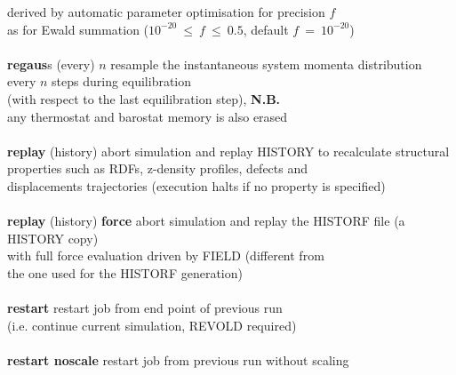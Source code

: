 \begin{tabbing}
\>                                              \> derived by automatic parameter optimisation for precision $f$ \\
\>                                              \> as for Ewald summation ($10^{-20}~\le~f~\le~0.5$, default $f~=~10^{-20}$) \\
\>                                              \> \\
\> {\bf regaus}s (every) $n$                    \> resample the instantaneous system momenta distribution \\
\>                                              \> every $n$ steps during equilibration \\
\>                                              \> (with respect to the last equilibration step), {\bf N.B.} \\
\>                                              \> any thermostat and barostat memory is also erased \\
\>                                              \> \\
\> {\bf replay} (history)                       \> abort simulation and replay HISTORY to recalculate structural \\
\>                                              \> properties such as RDFs, z-density profiles, defects and \\
\>                                              \> displacements trajectories (execution halts if no property is specified) \\
\>                                              \> \\
\> {\bf replay} (history) {\bf force}           \> abort simulation and replay the HISTORF file (a HISTORY copy) \\
\>                                              \> with full force evaluation driven by FIELD (different from \\
\>                                              \> the one used for the HISTORF generation) \\
\>                                              \> \\
\> {\bf restart}                                \> restart job from end point of previous run \\
\>                                              \> (i.e. continue current simulation, REVOLD required) \\
\>                                              \> \\
\> {\bf restart noscale}                        \> restart job from previous run without scaling \\

\end{tabbing}
